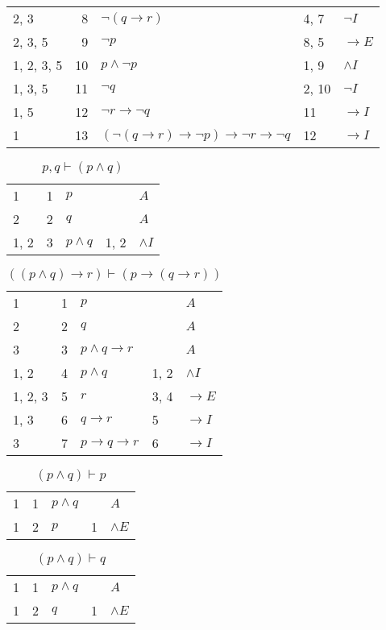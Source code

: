 \documentclass{article}
\begin{document}
\begin{table}[htbp]
\begin{tabular}{lrlll}
{2, 3} & 8 & $¬ (q→r)$ & {4, 7} & $¬I$ \\
{2, 3, 5} & 9 & $¬p$ & {8, 5} & $→E$ \\
{1, 2, 3, 5} & 10 & $p∧ ¬p$ & {1, 9} & $∧I$ \\
{1, 3, 5} & 11 & $¬q$ & {2, 10} & $¬I$ \\
{1, 5} & 12 & $¬r→ ¬q$ & {11} & $→I$ \\
{1} & 13 & $(¬ (q→r)→ ¬p)→ ¬r→ ¬q$ & {12} & $→I$ \\
\end{tabular}
\end{table}\begin{table}[htbp]\caption*{$p,q ⊢ (p ∧ q)$}\centering\begin{tabular}{lrlll}
{1} & 1 & $p$ & {} & $A$ \\
{2} & 2 & $q$ & {} & $A$ \\
{1, 2} & 3 & $p∧q$ & {1, 2} & $∧I$ \\
\end{tabular}
\end{table}\begin{table}[htbp]\caption*{$((p ∧ q) → r) ⊢ (p → (q → r))$}\centering\begin{tabular}{lrlll}
{1} & 1 & $p$ & {} & $A$ \\
{2} & 2 & $q$ & {} & $A$ \\
{3} & 3 & $p∧q→r$ & {} & $A$ \\
{1, 2} & 4 & $p∧q$ & {1, 2} & $∧I$ \\
{1, 2, 3} & 5 & $r$ & {3, 4} & $→E$ \\
{1, 3} & 6 & $q→r$ & {5} & $→I$ \\
{3} & 7 & $p→q→r$ & {6} & $→I$ \\
\end{tabular}
\end{table}\begin{table}[htbp]\caption*{$(p ∧ q) ⊢ p$}\centering\begin{tabular}{lrlll}
{1} & 1 & $p∧q$ & {} & $A$ \\
{1} & 2 & $p$ & {1} & $∧E$ \\
\end{tabular}
\end{table}\begin{table}[htbp]\caption*{$(p ∧ q) ⊢ q$}\centering\begin{tabular}{lrlll}
{1} & 1 & $p∧q$ & {} & $A$ \\
{1} & 2 & $q$ & {1} & $∧E$ \\
\end{tabular}

\end{table}
\end{document}
